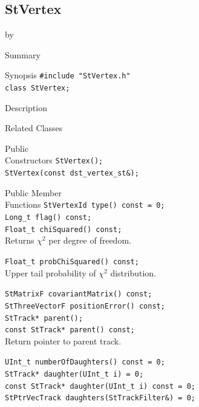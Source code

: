 \documentclass[twoside]{article}
\newcommand{\entrylabel}[1]{\mbox{\textbf{{#1}}}\hfil}%
\newenvironment{entry}
{\begin{list}{}%
    {\renewcommand{\makelabel}{\entrylabel}%
     \setlength{\labelwidth}{90pt}%
     \setlength{\leftmargin}{\labelwidth}
     \advance\leftmargin by \labelsep%
      }%
    }%
  {\end{list}}
\newcommand{\Entrylabel}[1]%
{\raisebox{0pt}[1ex][0pt]{\makebox[\labelwidth][l]%
    {\parbox[t]{\labelwidth}{\hspace{0pt}\textbf{{#1}}}}}}
\newenvironment{Entry}%
{\renewcommand{\entrylabel}{\Entrylabel}\begin{entry}}%
  {\end{entry}}
\begin{document}
\subsection{StVertex}
\label{sec:StVertex}
\begin{Entry}
\item[Summary]
\item[Synopsis]
    \verb+#include "StVertex.h"+\\
    \verb+class StVertex;+\\
\item[Description]
\item[Related Classes]
\item[Public\\ Constructors]
    \verb+StVertex();+\\
    \verb+StVertex(const dst_vertex_st&);+\\
\item[Public Member\\ Functions]
    \verb+StVertexId type() const = 0;+\\

    \verb+Long_t flag() const;+\\

    \verb+Float_t chiSquared() const;+\\
    Returns $\chi^2$ per degree of freedom. 

    \verb+Float_t probChiSquared() const;+\\
    Upper tail probability of $\chi^2$ distribution.

    \verb+StMatrixF covariantMatrix() const;+\\

    \verb+StThreeVectorF positionError() const;+\\
    
    \verb+StTrack* parent();+\\
    \verb+const StTrack* parent() const;+\\
    Return pointer to parent track.
    
    \verb+UInt_t numberOfDaughters() const = 0;+\\

    \verb+StTrack* daughter(UInt_t i) = 0;+\\
    \verb+const StTrack* daughter(UInt_t i) const = 0;+\\

    \verb+StPtrVecTrack daughters(StTrackFilter&) = 0;+\\


\end{Entry}
\end{document}
